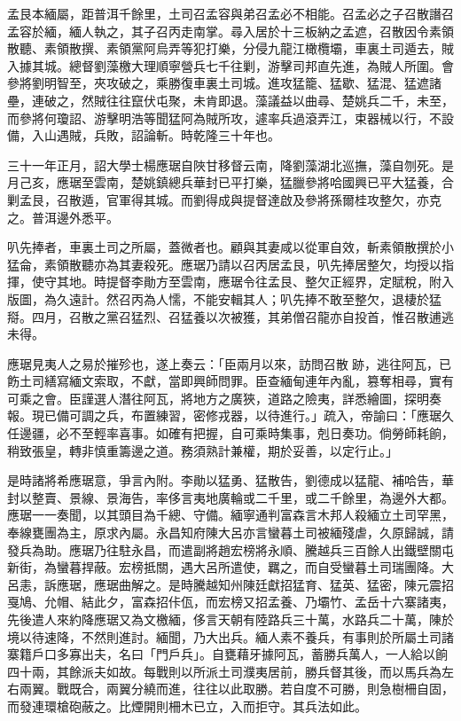 \begin{pinyinscope}
孟艮本緬屬，距普洱千餘里，土司召孟容與弟召孟必不相能。召孟必之子召散譖召孟容於緬，緬人執之，其子召丙走南掌。尋入居於十三板納之孟遮，召散因令素領散聽、素領散撰、素領黨阿烏弄等犯打樂，分侵九龍江橄欖壩，車裏土司遁去，賊入據其城。總督劉藻檄大理順寧營兵七千往剿，游擊司邦直先進，為賊人所圍。會參將劉明智至，夾攻破之，乘勝復車裏土司城。進攻猛籠、猛歇、猛混、猛遮諸壘，連破之，然賊往往竄伏屯聚，未肯即退。藻議益以曲尋、楚姚兵二千，未至，而參將何瓊詔、游擊明浩等聞猛阿為賊所攻，遽率兵過滾弄江，束器械以行，不設備，入山遇賊，兵敗，詔論斬。時乾隆三十年也。

三十一年正月，詔大學士楊應琚自陜甘移督云南，降劉藻湖北巡撫，藻自刎死。是月己亥，應琚至雲南，楚姚鎮總兵華封已平打樂，猛臘參將哈國興已平大猛養，合剿孟艮，召散遁，官軍得其城。而劉得成與提督達啟及參將孫爾桂攻整欠，亦克之。普洱邊外悉平。

叭先捧者，車裏土司之所屬，蓋微者也。顧與其妻咸以從軍自效，斬素領散撰於小猛侖，素領散聽亦為其妻殺死。應琚乃請以召丙居孟艮，叭先捧居整欠，均授以指揮，使守其地。時提督李勛方至雲南，應琚令往孟艮、整欠正經界，定賦稅，附入版圖，為久遠計。然召丙為人懦，不能安輯其人；叭先捧不敢至整欠，退棲於猛搿。四月，召散之黨召猛烈、召猛養以次被獲，其弟僧召龍亦自投首，惟召散逋逃未得。

應琚見夷人之易於摧殄也，遂上奏云：「臣兩月以來，訪問召散跡，逃往阿瓦，已飭土司繕寫緬文索取，不獻，當即興師問罪。臣查緬甸連年內亂，篡奪相尋，實有可乘之會。臣謹選人潛往阿瓦，將地方之廣狹，道路之險夷，詳悉繪圖，探明奏報。現已備可調之兵，布置練習，密修戎器，以待進行。」疏入，帝諭曰：「應琚久任邊疆，必不至輕率喜事。如確有把握，自可乘時集事，剋日奏功。倘勞師耗餉，稍致張皇，轉非慎重籌邊之道。務須熟計兼權，期於妥善，以定行止。」

是時諸將希應琚意，爭言內附。李勛以猛勇、猛散告，劉德成以猛龍、補哈告，華封以整賣、景線、景海告，率侈言夷地廣輪或二千里，或二千餘里，為邊外大都。應琚一一奏聞，以其頭目為千總、守備。緬寧通判富森言木邦人殺緬立土司罕黑，奉線甕團為主，原求內屬。永昌知府陳大呂亦言蠻暮土司被緬殘虐，久原歸誠，請發兵為助。應琚乃往駐永昌，而遣副將趙宏榜將永順、騰越兵三百餘人出鐵壁關屯新街，為蠻暮捍蔽。宏榜抵關，遇大呂所遣使，羈之，而自受蠻暮土司瑞團降。大呂恚，訴應琚，應琚曲解之。是時騰越知州陳廷獻招猛育、猛英、猛密，陳元震招戛鳩、允帽、結此夕，富森招佧佤，而宏榜又招孟養、乃壩竹、孟岳十六寨諸夷，先後遣人來約降應琚又為文檄緬，侈言天朝有陸路兵三十萬，水路兵二十萬，陳於境以待速降，不然則進討。緬聞，乃大出兵。緬人素不養兵，有事則於所屬土司諸寨籍戶口多寡出夫，名曰「門戶兵」。自甕藉牙據阿瓦，蓄勝兵萬人，一人給以餉四十兩，其餘派夫如故。每戰則以所派土司濮夷居前，勝兵督其後，而以馬兵為左右兩翼。戰既合，兩翼分繞而進，往往以此取勝。若自度不可勝，則急樹柵自固，而發連環槍砲蔽之。比煙開則柵木已立，入而拒守。其兵法如此。


\end{pinyinscope}
